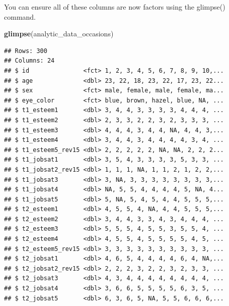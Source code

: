 \documentclass[
]{krantz}
\makeatletter
\newenvironment{Shaded}{\begin{snugshade}}{\end{snugshade}}
\newcommand{\DataTypeTok}[1]{\textcolor[rgb]{0.27,0.27,0.27}{#1}}
\newcommand{\KeywordTok}[1]{\textcolor[rgb]{0.27,0.27,0.27}{\textbf{#1}}}
\newcommand{\NormalTok}[1]{#1}
\newcommand{\OperatorTok}[1]{\textcolor[rgb]{0.43,0.43,0.43}{\textbf{#1}}}
\newcommand{\StringTok}[1]{\textcolor[rgb]{0.5,0.5,0.5}{#1}}
\newenvironment{kframe}{%
\medskip{}
\setlength{\fboxsep}{.8em}
 \def\at@end@of@kframe{}%
 \ifinner\ifhmode%
  \def\at@end@of@kframe{\end{minipage}}%
  \begin{minipage}{\columnwidth}%
 \fi\fi%
 \def\FrameCommand##1{\hskip\@totalleftmargin \hskip-\fboxsep
 \colorbox{shadecolor}{##1}\hskip-\fboxsep
     \hskip-\linewidth \hskip-\@totalleftmargin \hskip\columnwidth}%
 \MakeFramed {\advance\hsize-\width
   \@totalleftmargin\z@ \linewidth\hsize
   \@setminipage}}%
 {\par\unskip\endMakeFramed%
 \at@end@of@kframe}
\renewenvironment{Shaded}{\begin{kframe}}{\end{kframe}}
\makeatother
\begin{document}
\begin{Shaded}
\end{Shaded}

You can ensure all of these columns are now factors using the glimpse() command.

\begin{Shaded}
\begin{Highlighting}[]
\KeywordTok{glimpse}\NormalTok{(analytic_data_occasions)}
\end{Highlighting}
\end{Shaded}

\begin{verbatim}
## Rows: 300
## Columns: 24
## $ id               <fct> 1, 2, 3, 4, 5, 6, 7, 8, 9, 10,...
## $ age              <dbl> 23, 22, 18, 23, 22, 17, 23, 22...
## $ sex              <fct> male, female, male, female, ma...
## $ eye_color        <fct> blue, brown, hazel, blue, NA, ...
## $ t1_esteem1       <dbl> 3, 4, 4, 3, 3, 3, 3, 4, 4, 4, ...
## $ t1_esteem2       <dbl> 2, 3, 3, 2, 2, 3, 2, 3, 3, 3, ...
## $ t1_esteem3       <dbl> 4, 4, 4, 3, 4, 4, NA, 4, 4, 3,...
## $ t1_esteem4       <dbl> 3, 4, 4, 3, 4, 4, 4, 4, 3, 4, ...
## $ t1_esteem5_rev15 <dbl> 2, 2, 2, 2, 2, NA, NA, 2, 2, 2...
## $ t1_jobsat1       <dbl> 3, 5, 4, 3, 3, 3, 3, 5, 3, 3, ...
## $ t1_jobsat2_rev15 <dbl> 1, 1, 1, NA, 1, 1, 2, 1, 2, 2,...
## $ t1_jobsat3       <dbl> 3, NA, 3, 3, 3, 3, 3, 3, 3, 3,...
## $ t1_jobsat4       <dbl> NA, 5, 5, 4, 4, 4, 4, 5, NA, 4...
## $ t1_jobsat5       <dbl> 5, NA, 5, 4, 5, 4, 4, 5, 5, 5,...
## $ t2_esteem1       <dbl> 4, 5, 5, 4, NA, 4, 4, 5, 5, 5,...
## $ t2_esteem2       <dbl> 3, 4, 4, 3, 3, 4, 3, 4, 4, 4, ...
## $ t2_esteem3       <dbl> 5, 5, 5, 4, 5, 5, 3, 5, 5, 4, ...
## $ t2_esteem4       <dbl> 4, 5, 5, 4, 5, 5, 5, 5, 4, 5, ...
## $ t2_esteem5_rev15 <dbl> 3, 3, 3, 3, 3, 3, 3, 3, 3, 3, ...
## $ t2_jobsat1       <dbl> 4, 6, 5, 4, 4, 4, 4, 6, 4, NA,...
## $ t2_jobsat2_rev15 <dbl> 2, 2, 2, 3, 2, 2, 3, 2, 3, 3, ...
## $ t2_jobsat3       <dbl> 4, 3, 4, 4, 4, 4, 4, 4, 4, 4, ...
## $ t2_jobsat4       <dbl> 3, 6, 6, 5, 5, 5, 5, 6, 3, 5, ...
## $ t2_jobsat5       <dbl> 6, 3, 6, 5, NA, 5, 5, 6, 6, 6,...
\end{verbatim}
\end{document}
